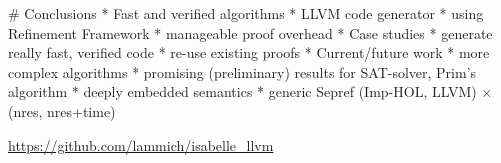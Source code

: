 \documentclass[fleqn]{beamer}
\begin{document}
# Conclusions
  * Fast and verified algorithms
    * LLVM code generator
    * using Refinement Framework
    * manageable proof overhead
  * Case studies
    * generate really fast, verified code
    * re-use existing proofs
  * Current/future work
    * more complex algorithms
      * promising (preliminary) results for SAT-solver, Prim's algorithm
    * deeply embedded semantics
    * generic Sepref (Imp-HOL, LLVM) $\times$ (nres, nres+time)

  \vfill

  \url{https://github.com/lammich/isabelle_llvm}


\end{document}
